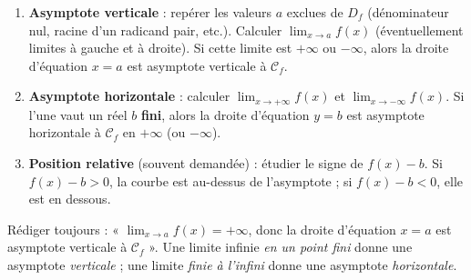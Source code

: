 \documentclass[11pt]{article}
\newcommand{\cle}[1]{{\popxbold\color{popdark}#1}}
\begin{document}
\begin{methode}
\begin{enumerate}
\item \textbf{Asymptote verticale} : repérer les valeurs $a$ exclues de $D_f$ (dénominateur nul, racine d'un radicand pair, etc.). Calculer $\displaystyle\lim_{x\to a} f(x)$ (éventuellement limites à gauche et à droite). Si cette limite est $+\infty$ ou $-\infty$, alors la droite d'équation \cle{$x=a$} est asymptote verticale à $\mathcal{C}_f$.
\item \textbf{Asymptote horizontale} : calculer $\displaystyle\lim_{x\to+\infty}f(x)$ et $\displaystyle\lim_{x\to-\infty}f(x)$. Si l'une vaut un réel $b$ \textbf{fini}, alors la droite d'équation \cle{$y=b$} est asymptote horizontale à $\mathcal{C}_f$ en $+\infty$ (ou $-\infty$).
\item \textbf{Position relative} (souvent demandée) : étudier le signe de $f(x)-b$. Si $f(x)-b>0$, la courbe est au-dessus de l'asymptote ; si $f(x)-b<0$, elle est en dessous.
\end{enumerate}
\begin{aretenir}
Rédiger toujours : « $\displaystyle\lim_{x\to a}f(x)=+\infty$, donc la droite d'équation $x=a$ est asymptote verticale à $\mathcal{C}_f$ ». Une limite infinie \emph{en un point fini} donne une asymptote \emph{verticale} ; une limite \emph{finie à l'infini} donne une asymptote \emph{horizontale}.
\end{aretenir}
\end{methode}
\end{document}
